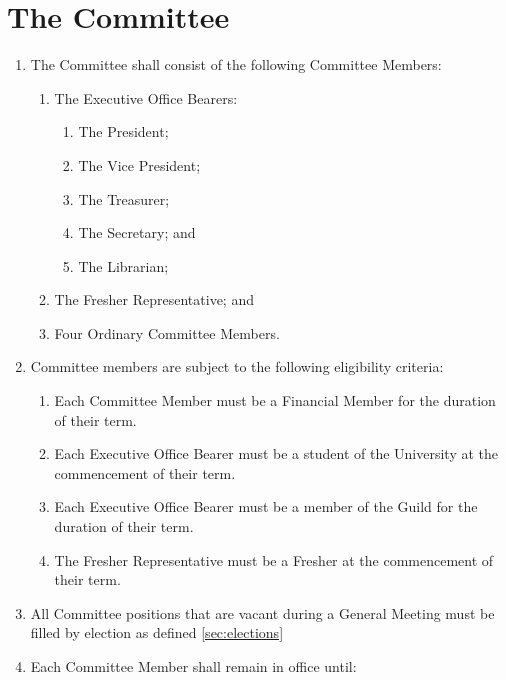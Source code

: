\documentclass[a4paper]{article}
\begin{document}
\section{The Committee} \label{sec:committee}
\begin{enumerate}
    \item The Committee shall consist of the following Committee Members:
          \begin{enumerate}
              \item The Executive Office Bearers:
                    \begin{enumerate}
                        \item The President;
                        \item The Vice President;
                        \item The Treasurer;
                        \item The Secretary; and
                        \item The Librarian;
                    \end{enumerate}
              \item The Fresher Representative; and
              \item Four Ordinary Committee Members.
          \end{enumerate}
    \item Committee members are subject to the following eligibility criteria:
          \begin{enumerate}
              \item Each Committee Member must be a Financial Member for the duration of their term.
              \item \label{item:exec_is_student} Each Executive Office Bearer must be a student of the University at the commencement of their term.
              \item \label{item:exec_is_guild} Each Executive Office Bearer must be a member of the Guild for the duration of their term.
              \item \label{item:frep_is_fresh} The Fresher Representative must be a Fresher at the commencement of their term.
          \end{enumerate}
    \item All Committee positions that are vacant during a General Meeting must be filled by election as defined \cref{sec:elections}
    \item Each Committee Member shall remain in office until:
          \begin{enumerate}

\end{enumerate}
\end{enumerate}
\end{document}
